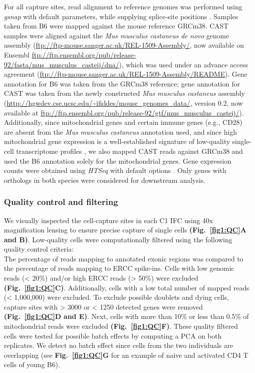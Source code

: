 For all capture sites, read alignment to reference genomes was performed using \emph{gsnap} with default parameters, while supplying splice-site positions \citep{Wu2010a}. 
Samples taken from B6 were mapped against the mouse reference \gls{GRCm38}. 
CAST samples were aligned against the \emph{Mus musculus castaneus de novo} genome assembly (\url{ftp://ftp-mouse.sanger.ac.uk/REL-1509-Assembly/}, now available on Ensembl \url{ftp://ftp.ensembl.org/pub/release-92/fasta/mus_musculus_casteij/dna/}), which was used under an advance access agreement (\url{ftp://ftp-mouse.sanger.ac.uk/REL-1509-Assembly/README}). 
Gene annotation for B6 was taken from the GRCm38 reference; gene annotation for CAST was taken from the newly constructed \emph{Mus musculus castaneus} assembly (\url{http://hgwdev.cse.ucsc.edu/~ifiddes/mouse_genomes_data/}, version 0.2, now available at \url{ftp://ftp.ensembl.org/pub/release-92/gtf/mus_musculus_casteij/}). 
Additionally, since mitochondrial genes and certain immune genes (e.g., CD28) are absent from the \emph{Mus musculus castaneus} annotation used, and since high mitochondrial gene expression is a well-established signature of low-quality single-cell transcriptome profiles \citep{Ilicic2016}, we also mapped CAST reads against GRCm38 and used the B6 annotation solely for the mitochondrial genes. 
Gene expression counts were obtained using \emph{HTSeq} with default options \citep{Anders2014}. 
Only genes with orthologs in both species were considered for downstream analysis. 

\subsubsection{Quality control and filtering}

We visually inspected the cell-capture sites in each C1 IFC using 40x magnification lensing to ensure precise capture of single cells \textbf{(Fig.~\ref{fig1:QC}A and B)}. 
Low-quality cells were computationally filtered using the following quality control criteria:\\
The percentage of reads mapping to annotated exonic regions was compared to the percentage of reads mapping to ERCC spike-ins. 
Cells with low genomic reads (< 20\%) and/or high ERCC reads (> 50\%) were excluded \textbf{(Fig.~\ref{fig1:QC}C)}. 
Additionally, cells with  a low total number of mapped reads (< 1,000,000) were excluded. 
To exclude possible doublets and dying cells, capture sites with > 3000 or < 1250 detected genes were removed \textbf{(Fig.~\ref{fig1:QC}D and E)}. 
Next, cells with more than 10\% or less than 0.5\% of mitochondrial reads were excluded \textbf{(Fig.~\ref{fig1:QC}F)}. These quality filtered cells were tested for possible batch effects by computing a PCA on both replicates. 
We detect no batch effect since cells from the two individuals are overlapping (see \textbf{Fig.~\ref{fig1:QC}G} for an example of naive and activated CD4\plus{} T cells of young B6).\\

